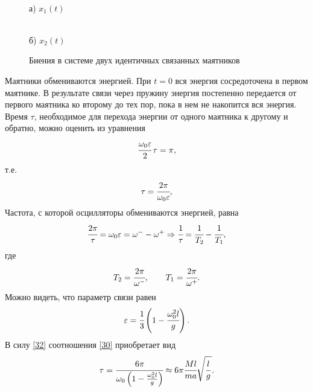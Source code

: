 \documentclass[a4paper,12pt]{article}
\theoremstyle{plain} %
\theoremstyle{definition} %
\theoremstyle{remark} %
\begin{document}
\begin{center}
	\begin{figure}[h]
		\begin{minipage}{0.5\linewidth}
			\noindent{}\\ а) $x_1(t)$
		\end{minipage}
		\hfill
		\begin{minipage}{0.5\linewidth}
			\noindent{}\\ б) $x_2(t)$
		\end{minipage}
		\hfill
		\caption{Биения в системе двух идентичных
			связанных маятников}
		\label{bien}
		\vspace{-0.5cm}
	\end{figure}
\end{center}
Маятники обмениваются энергией. При $t=0$ вся энергия
сосредоточена в первом маятнике. В результате связи через пружину
энергия постепенно передается от первого маятника ко второму до тех
пор, пока в нем не накопится вся энергия. Время $\tau$, необходимое для
перехода энергии от одного маятника к другому и обратно, можно оценить из уравнения
$$\cfrac{\omega_0\varepsilon}{2}\,\tau=\pi,$$
т.е.
\begin{equation}
\tau=\cfrac{2\pi}{\omega_0\varepsilon},
\label{30}
\end{equation}
Частота, с которой осцилляторы обмениваются энергией, равна
\begin{equation}
\cfrac{2\pi}{\tau}=\omega_0\varepsilon=\omega^--\omega^+ \Rightarrow \cfrac{1}{\tau}=\cfrac{1}{T_2}-\cfrac{1}{T_1},
\label{31}
\end{equation}
где $$T_2=\cfrac{2\pi}{\omega^-},\qquad T_1=\cfrac{2\pi}{\omega^+}.$$
\vspace{5pt}Можно видеть, что параметр связи равен
\begin{equation}
\varepsilon=\cfrac{1}{3}\left(1-\cfrac{\omega^2_0l}{g}\right).
\label{32}
\end{equation}
В силу \eqref{32} соотношения \eqref{30} приобретает вид
\begin{equation}
\tau=\cfrac{6\pi}{\omega_0\left(1-\frac{\omega^2_0l}{g}\right)} \approx 6\pi\cfrac{Ml}{ma}\sqrt{\cfrac{l}{g}\,}.
\label{33}
\end{equation}
\end{document}

